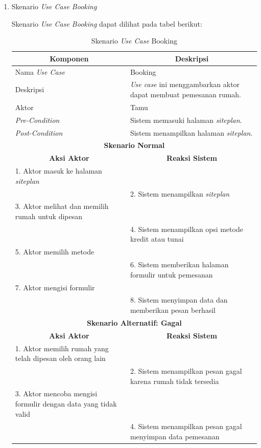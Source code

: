 \begin{enumerate}[label=\alph*.]
    
    \item Skenario \textit{Use Case Booking}
    
	\par Skenario \textit{Use Case Booking} dapat dilihat pada tabel berikut:

        \begin{longtable}{|p{5cm}|p{9cm}|}
	    \caption{Skenario \textit{Use Case} Booking}
	    \label{tab:my-table} \\ \hline
	    \multicolumn{1}{|c|}{\textbf{Komponen}} & \multicolumn{1}{c|}{\textbf{Deskripsi}} \\ \hline
	    \endfirsthead
	    \endhead
	    Nama \textit{Use Case} & Booking \\ \hline
	    Deskripsi & \textit{Use case} ini menggambarkan aktor dapat membuat pemesanan rumah. \\ \hline
	    Aktor & Tamu \\ \hline
	    \textit{Pre-Condition} & Sistem memasuki halaman \textit{siteplan}. \\ \hline
	    \textit{Post-Condition} & Sistem menampilkan halaman \textit{siteplan}. \\ \hline
	    \multicolumn{2}{|c|}{\textbf{Skenario Normal}} \\ \hline
	    \multicolumn{1}{|c|}{\textbf{Aksi Aktor}} & \multicolumn{1}{c|}{\textbf{Reaksi Sistem}} \\ \hline
	    1. Aktor masuk ke halaman \textit{siteplan} & \\ \hline
	    & 2. Sistem menampilkan \textit{siteplan} \\ \hline
	    3. Aktor melihat dan memilih rumah untuk dipesan & \\ \hline
	    & 4. Sistem menampilkan opsi metode kredit atau tunai \\ \hline
	    5. Aktor memilih metode & \\ \hline
	    & 6. Sistem memberikan halaman formulir untuk pemesanan \\ \hline
	    7. Aktor mengisi formulir & \\ \hline
	    & 8. Sistem menyimpan data dan memberikan pesan berhasil \\ \hline
	    \multicolumn{2}{|c|}{\textbf{Skenario Alternatif: Gagal}} \\ \hline
	    \multicolumn{1}{|c|}{\textbf{Aksi Aktor}} & \multicolumn{1}{c|}{\textbf{Reaksi Sistem}} \\ \hline
	    1. Aktor memilih rumah yang telah dipesan oleh orang lain & \\ \hline
	    & 2. Sistem menampilkan pesan gagal karena rumah tidak tersedia \\ \hline
	    3. Aktor mencoba mengisi formulir dengan data yang tidak valid & \\ \hline
	    & 4. Sistem menampilkan pesan gagal menyimpan data pemesanan \\ \hline
	\end{longtable}
    

\end{enumerate}
